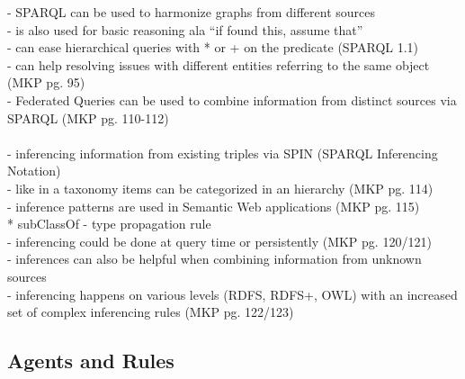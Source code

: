 - SPARQL can be used to harmonize graphs from different sources \\
- is also used for basic reasoning ala ``if found this, assume that'' \\
- can ease hierarchical queries with * or + on the predicate (SPARQL 1.1) \\
- can help resolving issues with different entities referring to the same object (MKP pg. 95)\\
- Federated Queries can be used to combine information from distinct sources via SPARQL (MKP pg. 110-112)\\
\\
- inferencing information from existing triples via SPIN (SPARQL Inferencing Notation) \\
- like in a taxonomy items can be categorized in an hierarchy (MKP pg. 114) \\
- inference patterns are used in Semantic Web applications (MKP pg. 115) \\
   * subClassOf - type propagation rule \\
- inferencing could be done at query time or persistently (MKP pg. 120/121) \\
- inferences can also be helpful when combining information from unknown sources \\
- inferencing happens on various levels (RDFS, RDFS+, OWL) with an increased set of complex inferencing rules (MKP pg. 122/123)
\\

\subsection{Agents and Rules}
\label{sec:semantic_logic_rules}



